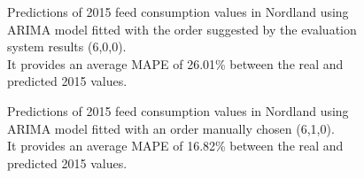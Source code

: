 \newpage

\begin{figure}[H]
    \caption[Predicted 2015 feed consumption in Nordland. Evaluation system ARIMA order.]{Predictions of 2015 feed consumption values in Nordland using ARIMA model fitted with the order suggested by the evaluation system results (6,0,0).\\  It provides an average MAPE of 26.01\% between the real and predicted 2015 values. }
    \label{fig: Nordland_ARIMAevaluation}
\end{figure}

\begin{figure}[H]
    \caption[Predicted 2015 feed consumption in Nordland. Manual ARIMA order.]{Predictions of 2015 feed consumption values in Nordland using ARIMA model fitted with an order manually chosen (6,1,0).\\  It provides an average MAPE of 16.82\% between the real and predicted 2015 values. }
    \label{fig: Nordland_ARIMAmanual}
\end{figure}


